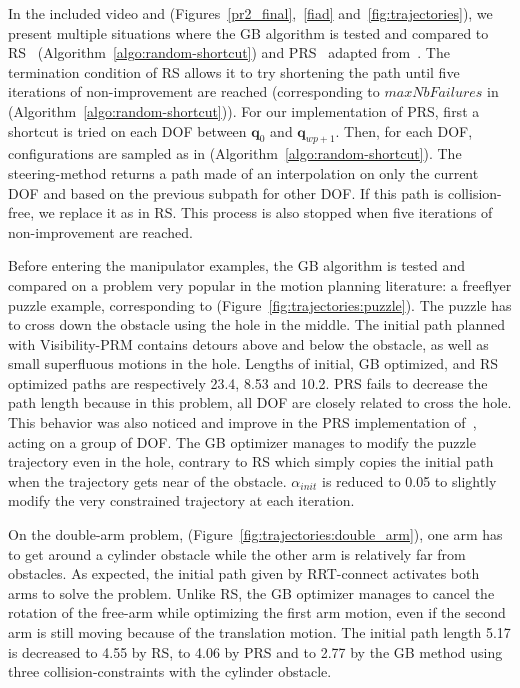 \documentclass{tADR2e}
\newcommand\conf{\mathbf{q}}
\begin{document}
In the included video and (Figures~\ref{pr2_final},~\ref{fiad} 
and~\ref{fig:trajectories}), we present multiple situations where the GB algorithm 
is tested and compared to RS~\cite{randomShortcutHPP}
(Algorithm~\ref{algo:random-shortcut}) and PRS~\cite{partialrandomShortcutHPP} 
adapted from~\cite{Geraerts04clearancebased}.
The termination condition of RS allows it to try 
shortening the path until five iterations of non-improvement are reached 
(corresponding to $maxNbFailures$ in (Algorithm~\ref{algo:random-shortcut})).
For our implementation of PRS, first a shortcut is tried on each DOF between 
$\conf_0$ and $\conf_{wp+1}$. 
Then, for each DOF, configurations are sampled as in 
(Algorithm~\ref{algo:random-shortcut}). The steering-method returns a path made of 
an interpolation on only 
the current DOF and based on the previous subpath for other DOF. If this path is 
collision-free, we replace it as in RS. This process is also stopped when five 
iterations of non-improvement are reached.

\vspace{0.4cm}
Before entering the manipulator examples, the GB algorithm is tested and compared 
on a problem very popular in the motion planning literature: a freeflyer puzzle 
example, corresponding to (Figure~\ref{fig:trajectories:puzzle}).  The puzzle has to cross down the 
obstacle using the hole in the middle. The initial path planned with Visibility-PRM 
contains detours above and below the obstacle, as well as small superfluous
motions in the hole. 
Lengths of initial, GB optimized, and RS optimized paths are 
respectively 23.4, 8.53 and 10.2. PRS fails to decrease the path length because in 
this problem, all DOF are closely related to cross the hole. This behavior was also 
noticed and improve in the PRS implementation of~\cite{Geraerts04clearancebased}, 
acting on a group of DOF. The GB optimizer manages to modify the puzzle trajectory 
even in the hole, contrary to RS which simply copies the initial path when the 
trajectory gets near of the obstacle. $\alpha_{init}$ is reduced to 0.05 to slightly modify the very constrained trajectory at each iteration.

\vspace{0.4cm}

On the double-arm problem, (Figure~\ref{fig:trajectories:double_arm}), one arm has 
to get around a cylinder obstacle while the 
other arm is relatively far from obstacles. As expected, the initial path given by 
RRT-connect activates both arms to solve the problem. Unlike RS, 
the GB optimizer manages to cancel the rotation of the free-arm while optimizing the 
first arm motion, even if the second arm is still moving because of the translation 
motion. The initial path length 5.17 is decreased to 4.55 by RS, to 4.06 by PRS and 
to 2.77 by the GB method using three collision-constraints with the cylinder obstacle.
\end{document}
